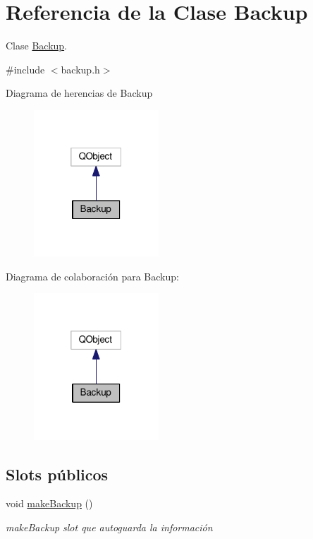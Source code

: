 \hypertarget{class_backup}{}\section{Referencia de la Clase Backup}
\label{class_backup}


Clase \hyperlink{class_backup}{Backup}.  




{\ttfamily \#include $<$backup.\+h$>$}



Diagrama de herencias de Backup\nopagebreak
\begin{figure}[H]
\begin{center}
\leavevmode
\includegraphics[width=133pt]{class_backup__inherit__graph}
\end{center}
\end{figure}


Diagrama de colaboración para Backup\+:\nopagebreak
\begin{figure}[H]
\begin{center}
\leavevmode
\includegraphics[width=133pt]{class_backup__coll__graph}
\end{center}
\end{figure}
\subsection*{Slots públicos}
\begin{DoxyCompactItemize}
\item 
void \hyperlink{class_backup_ad6e36a267c5dfb06fd33a4ea4d879595}{make\+Backup} ()\hypertarget{class_backup_ad6e36a267c5dfb06fd33a4ea4d879595}{}\label{class_backup_ad6e36a267c5dfb06fd33a4ea4d879595}

\begin{DoxyCompactList}\small\item\em make\+Backup slot que autoguarda la información \end{DoxyCompactList}\end{DoxyCompactItemize}
